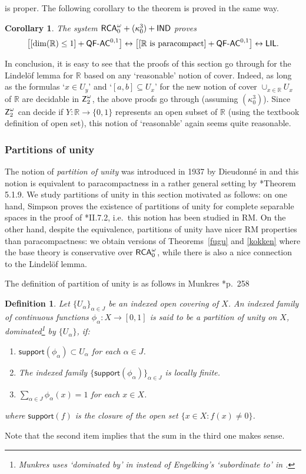 \documentclass[reqno]{amsart}
\newtheorem{cor}[thm]{Corollary}
\newtheorem{defi}[thm]{Definition}
\newcommand\be{\begin{equation}}
\newcommand\ee{\end{equation}}
\def\bdefi{\begin{defi}\rm}
\def\edefi{\end{defi}}
\def\Z{\textup{\textsf{Z}}}
\def\RCAo{\textup{\textsf{RCA}}_{0}^{\omega}}
\def\R{{\mathbb  R}}
\def\di{\rightarrow}
\def\asa{\leftrightarrow}
\def\QFAC{\textup{\textsf{QF-AC}}}
\def\LIL{\textup{\textsf{LIL}}}
\numberwithin{equation}{section}
\numberwithin{thm}{section}
\begin{document}
is proper.  The following corollary to the theorem is proved in the same way.  
\begin{cor}
The system $\RCAo+(\kappa_{0}^{3})+\textsf{\textup{IND}}$ proves 
\be
\big[[\dim(\R)\leq 1]+\QFAC^{0,1}\big]\asa \big[[\textup{$\R$ is paracompact}]+\QFAC^{0,1}\big] \asa \LIL. 
\ee
\end{cor}
In conclusion, it is easy to see that the proofs of this section go through for the Lindel\"of lemma for $\R$ based on {any `reasonable' notion} of cover.
Indeed, as long as the formulas `$x\in U_{y}$' and `$[a,b]\subseteq U_{x}$' for the new notion of cover $\cup_{x\in \R}U_{x}$ of $\R$ are decidable in $\Z_{2}^{\omega}$, the above proofs go through (assuming $(\kappa_{0}^{3})$).  
Since $\Z_{2}^{\omega}$ can decide if $Y:\R\di \{0,1\}$ represents an open subset of $\R$ (using the textbook definition of open set), this notion of `reasonable' again seems quite reasonable. 

\subsubsection{Partitions of unity}\label{unite}
The notion of \emph{partition of unity} was introduced in 1937 by Dieudonn\'e in \cite{nogeengodsgeschenkje} and this notion is equivalent to paracompactness in a rather general setting by \cite{bengelkoning}*{Theorem 5.1.9}.
We study partitions of unity in this section motivated as follows: on one hand, Simpson proves the existence of {partitions of unity} for complete separable spaces in the proof of \cite{simpson2}*{II.7.2}, i.e.\ this notion has been studied in RM.  
On the other hand, despite the equivalence, partitions of unity have nicer RM properties than paracompactness: we obtain versions of Theorems~\ref{fugu} and \ref{kokken} where the base theory is conservative over $\RCAo$, while there is also a nice connection to the Lindel\"of lemma.   

\smallskip

The definition of partition of unity is as follows in Munkres \cite{munkies}*{p.\ 258}
\bdefi
Let $\{U_{\alpha}\}_{\alpha\in J}$ be an indexed open covering of $X$. An indexed family of
continuous functions $\phi_{\alpha}: X \di [0, 1]$ is said to be a partition of unity on $X$, dominated\footnote{Munkres uses `dominated by' in \cite{munkies} instead of Engelking's `subordinate to' in \cite{bengelkoning}.} by $\{U_{\alpha}\}$, if:
\begin{enumerate}
\item $\textsf{support}(\phi_{\alpha})\subset U_{\alpha}$ for each $\alpha\in J$.
\item The indexed family $\{\textsf{support}(\phi_{\alpha})\}_{\alpha\in J}$ is locally finite.
\item $\sum_{\alpha\in J}\phi_{\alpha}(x)=1$ for each $x\in X$.
\end{enumerate}
where $\textsf{support}(f)$ is the closure of the open set $\{x\in X:f(x)\ne 0\}$.
\edefi\noindent
Note that the second item implies that the sum in the third one makes sense.  
\end{document}
